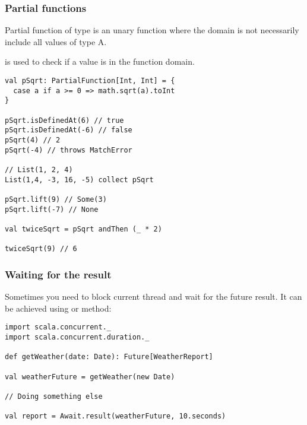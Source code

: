 \begin{frame}[fragile]
\frametitle{Partial functions}
Partial function of type  is an unary function
where the domain is not necessarily include all values of type A.

 is used to check if a value is in the function domain.

\begin{example}
\begin{lstlisting}
val pSqrt: PartialFunction[Int, Int] = {
  case a if a >= 0 => math.sqrt(a).toInt
}

pSqrt.isDefinedAt(6) // true
pSqrt.isDefinedAt(-6) // false
pSqrt(4) // 2
pSqrt(-4) // throws MatchError

// List(1, 2, 4)
List(1,4, -3, 16, -5) collect pSqrt

pSqrt.lift(9) // Some(3)
pSqrt.lift(-7) // None

val twiceSqrt = pSqrt andThen (_ * 2)

twiceSqrt(9) // 6
\end{lstlisting}
\end{example}

\end{frame}

\begin{frame}[fragile]
\frametitle{Waiting for the result}
Sometimes you need to block current thread and wait for the future result.
It can be achieved using  or  method:
\begin{example}
\begin{lstlisting}
import scala.concurrent._
import scala.concurrent.duration._

def getWeather(date: Date): Future[WeatherReport]

val weatherFuture = getWeather(new Date)

// Doing something else

val report = Await.result(weatherFuture, 10.seconds)
\end{lstlisting}
\end{example}
\end{frame}

